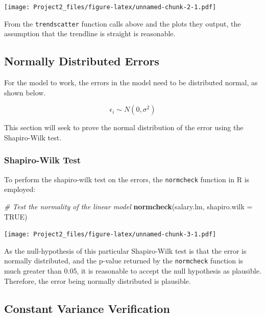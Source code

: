 \documentclass[]{article}
\newenvironment{Shaded}{\begin{snugshade}}{\end{snugshade}}
\newcommand{\CommentTok}[1]{\textcolor[rgb]{0.56,0.35,0.01}{\textit{#1}}}
\newcommand{\DataTypeTok}[1]{\textcolor[rgb]{0.13,0.29,0.53}{#1}}
\newcommand{\KeywordTok}[1]{\textcolor[rgb]{0.13,0.29,0.53}{\textbf{#1}}}
\newcommand{\NormalTok}[1]{#1}
\newcommand{\OtherTok}[1]{\textcolor[rgb]{0.56,0.35,0.01}{#1}}
\begin{document}
\texttt{[image: Project2\_files/figure-latex/unnamed-chunk-2-1.pdf]}

From the \texttt{trendscatter} function calls above and the plots they
output, the assumption that the trendline is straight is reasonable.

\hypertarget{normally-distributed-errors}{%
\subsection{Normally Distributed
Errors}\label{normally-distributed-errors}}

For the model to work, the errors in the model need to be distributed
normal, as shown below.

\[\epsilon_i \sim N(0,\sigma^2)\]

This section will seek to prove the normal distribution of the error
using the Shapiro-Wilk test.

\hypertarget{shapiro-wilk-test}{%
\subsubsection{Shapiro-Wilk Test}\label{shapiro-wilk-test}}

To perform the shapiro-wilk test on the errors, the \texttt{normcheck}
function in R is employed:

\begin{Shaded}
\begin{Highlighting}[]
\CommentTok{# Test the normality of the linear model}
\KeywordTok{normcheck}\NormalTok{(salary.lm, }\DataTypeTok{shapiro.wilk =} \OtherTok{TRUE}\NormalTok{)}
\end{Highlighting}
\end{Shaded}

\texttt{[image: Project2\_files/figure-latex/unnamed-chunk-3-1.pdf]}

As the null-hypothesis of this particular Shapiro-Wilk test is that the
error is normally distributed, and the p-value returned by the
\texttt{normcheck} function is much greater than 0.05, it is reasonable
to accept the null hypothesis as plausible. Therefore, the error being
normally distributed is plausible.

\hypertarget{constant-variance-verification}{%
\subsection{Constant Variance
Verification}\label{constant-variance-verification}}
\end{document}

